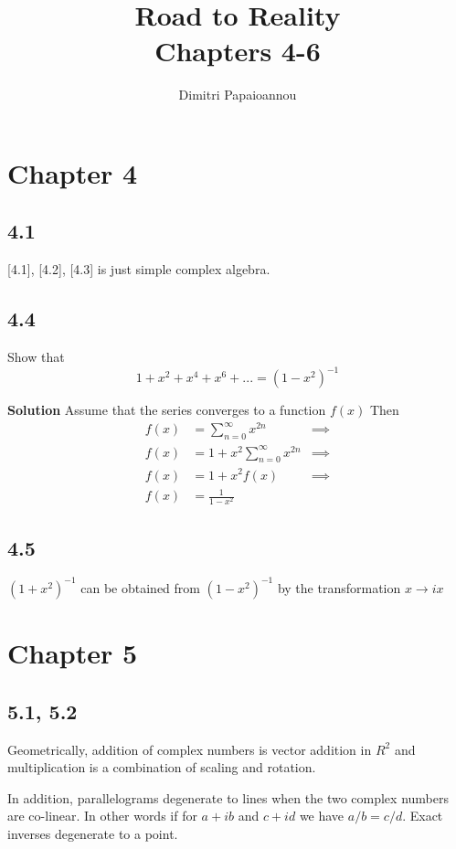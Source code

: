 \documentclass[]{article}
\title{Road to Reality\\ Chapters 4-6}
\author{Dimitri Papaioannou}
\begin{document}
\maketitle



\section*{Chapter 4}

\subsection*{4.1}

[4.1], [4.2], [4.3] is just simple complex algebra.



\subsection*{4.4}
Show that
$$
1+x^2+x^4+x^6+... = (1-x^2)^{-1}
$$

\textbf{Solution}
Assume that the series converges to a function $f(x)$
Then
\begin{eqnarray}
f(x) &= \sum_{n=0}^\infty x^{2n} &\implies \\
f(x) &= 1 + x^2\sum_{n=0}^\infty x^{2n} &\implies \\
f(x) &= 1+x^2f(x) &\implies \\
f(x) &= \frac{1}{1-x^2}
\end{eqnarray}


\subsection*{4.5}
$(1+x^2)^{-1}$ can be obtained from $(1-x^2)^{-1}$ by the transformation $x \rightarrow ix$

\section*{Chapter 5}

\subsection*{5.1, 5.2}
Geometrically, addition of complex numbers is vector addition in $R^2$ 
and multiplication is a combination of scaling and rotation.

In addition, parallelograms degenerate to lines when the two complex numbers are co-linear.
In other words if for $a+ib$ and $c+id$ we have $a/b = c/d$. Exact inverses degenerate to a point.
\end{document}
